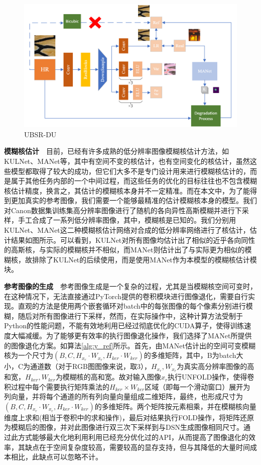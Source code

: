 \begin{figure}[h]
    \centering
    \includegraphics[width=1.0\textwidth]{imgs/UBSR-DU.png}
    \caption{UBSR-DU}
    \label{fig:UBSR-DU}
\end{figure}


\noindent\textbf{模糊核估计}\ \ 目前，已经有许多成熟的低分辨率图像模糊核估计方法，如KULNet、MANet等，其中有空间不变的核估计，也有空间变化的核估计，虽然这些模型都取得了较大的成功，但它们大多不是专门设计用来进行模糊核估计的，而是属于其他任务内部的一个中间过程，而这些任务的优化的目标往往也不包含模糊核估计精度，换言之，其估计的模糊核本身并不一定精准。而在本文中，为了能得到更加真实的参考图像，我们需要一个能够最精准的估计模糊核本身的模型。我们对Canon数据集训练集高分辨率图像进行了随机的各向异性高斯模糊并进行下采样，手工合成了一系列低分辨率图像，其中，模糊核是已知的。我们分别用KULNet、MANet这二种模糊核估计网络对合成的低分辨率网络进行了核估计，估计结果如图所示。可以看到，KULNet对所有图像均估计出了相似的近乎各向同性的高斯核，与实际的模糊核并不相似，而MANet则估计出了与实际更为相似的模糊核，故排除了KULNet的后续使用，而是使用MANet作为本模型的模糊核估计模块。

\noindent\textbf{参考图像的生成}\ \ 参考图像生成是一个复杂的过程，尤其是当模糊核空间可变时，在这种情况下，无法直接通过PyTorch提供的卷积模块进行图像退化，需要自行实现。直观的方法是使用两个嵌套循环对batch中的每张图像的每个像素分别进行模糊，随后对所有图像进行下采样，然而，在实际操作中，这种计算方法受制于Python的性能问题，不能有效地利用已经过彻底优化的CUDA算子，使得训练速度大幅减缓。为了能够更有效率的执行图像退化操作，我们选择了MANet所提供的图像退化方案。如算法\ref{alg:y_ref}所示。首先，由MANet估计出的空间可变模糊核为一个尺寸为$(B,C,H_{x_r}\cdot W_{x_r},H_{ker}\cdot W_{ker})$的多维矩阵，其中，B为batch大小，C为通道数（对于RGB图图像来说，取3），$H_{x_r},W_{x_r}$为真实高分辨率图像的高和宽，$H_{ker},W_{ker}$为模糊核的高和宽。故对输入图像$x_r$执行UNFOLD操作，使得卷积过程中每个需要执行矩阵乘法的$H_{ker}\times W_{ker}$区域（即每一个滑动窗口）展开为列向量，并将每个通道的所有列向量向量组成二维矩阵，最终，也形成尺寸为$(B,C,H_{x_r}\cdot W_{x_r},H_{ker}\cdot W_{ker})$的多维矩阵。两个矩阵按元素相乘，并在模糊核向量维度上求和(相当于卷积中的求和操作)，最后对结果执行FOLD操作，将矩阵还原为模糊后的图像，并对此图像进行双三次下采样到与DSN生成图像相同尺寸。通过此方式能够最大化地利用利用已经充分优化过的API，从而提高了图像退化的效率，其缺点在于空间复杂度较高，需要较高的显存支持，但与其降低的大量时间成本相比，此缺点可以忽略不计。

